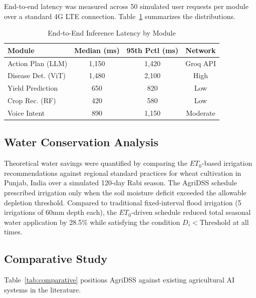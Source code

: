 \documentclass[conference]{IEEEtran}
\begin{document}
End-to-end latency was measured across 50 simulated user requests per module over a standard 4G LTE connection. Table~\ref{tab:latency} summarizes the distributions.

\begin{table}[htbp]
\caption{End-to-End Inference Latency by Module}
\label{tab:latency}
\centering
\begin{tabular}{lccc}
\toprule
\textbf{Module} & \textbf{Median (ms)} & \textbf{95th Pctl (ms)} & \textbf{Network} \\
\midrule
Action Plan (LLM) & 1,150 & 1,420 & Groq API \\
Disease Det. (ViT) & 1,480 & 2,100 & High \\
Yield Prediction & 650 & 820 & Low \\
Crop Rec. (RF) & 420 & 580 & Low \\
Voice Intent & 890 & 1,150 & Moderate \\
\bottomrule
\end{tabular}
\end{table}

\subsection{Water Conservation Analysis}

Theoretical water savings were quantified by comparing the $ET_0$-based irrigation recommendations against regional standard practices for wheat cultivation in Punjab, India over a simulated 120-day Rabi season. The AgriDSS schedule prescribed irrigation only when the soil moisture deficit exceeded the allowable depletion threshold. Compared to traditional fixed-interval flood irrigation (5 irrigations of 60mm depth each), the $ET_0$-driven schedule reduced total seasonal water application by 28.5\% while satisfying the condition $D_i < \text{Threshold}$ at all times.

\subsection{Comparative Study}

Table~\ref{tab:comparative} positions AgriDSS against existing agricultural AI systems in the literature.
\end{document}
